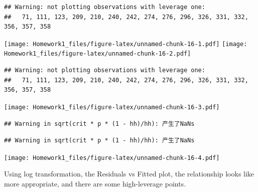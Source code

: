 \documentclass[]{article}
\newenvironment{Shaded}{\begin{snugshade}}{\end{snugshade}}
\newcommand{\KeywordTok}[1]{\textcolor[rgb]{0.13,0.29,0.53}{\textbf{#1}}}
\newcommand{\DecValTok}[1]{\textcolor[rgb]{0.00,0.00,0.81}{#1}}
\newcommand{\StringTok}[1]{\textcolor[rgb]{0.31,0.60,0.02}{#1}}
\newcommand{\OperatorTok}[1]{\textcolor[rgb]{0.81,0.36,0.00}{\textbf{#1}}}
\newcommand{\NormalTok}[1]{#1}
\begin{document}
\begin{verbatim}
## Warning: not plotting observations with leverage one:
##   71, 111, 123, 209, 210, 240, 242, 274, 276, 296, 326, 331, 332, 356, 357, 358
\end{verbatim}

\texttt{[image: Homework1\_files/figure-latex/unnamed-chunk-16-1.pdf]}
\texttt{[image: Homework1\_files/figure-latex/unnamed-chunk-16-2.pdf]}

\begin{verbatim}
## Warning: not plotting observations with leverage one:
##   71, 111, 123, 209, 210, 240, 242, 274, 276, 296, 326, 331, 332, 356, 357, 358
\end{verbatim}

\texttt{[image: Homework1\_files/figure-latex/unnamed-chunk-16-3.pdf]}

\begin{verbatim}
## Warning in sqrt(crit * p * (1 - hh)/hh): 产生了NaNs
\end{verbatim}

\begin{verbatim}
## Warning in sqrt(crit * p * (1 - hh)/hh): 产生了NaNs
\end{verbatim}

\texttt{[image: Homework1\_files/figure-latex/unnamed-chunk-16-4.pdf]}

Using log transformation, the Residuals vs Fitted plot, the relationship
looks like more appropriate, and there are some high-leverage points.

\begin{Shaded}
\end{Shaded}
\end{document}
